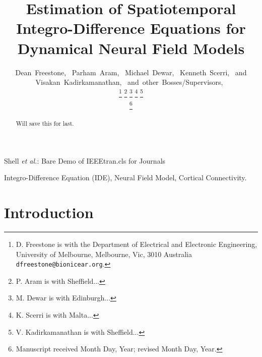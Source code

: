 \documentclass[journal]{IEEEtran}
\begin{document}
\title{Estimation of Spatiotemporal Integro-Difference Equations for Dynamical Neural Field Models}

\author{Dean~Freestone,~
        Parham~Aram,~
        Michael~Dewar,~
        Kenneth~Scerri,~
        and Visakan~Kadirkamanathan,~
        and~other~Bosses/Supervisors,~%

\thanks{D. Freestone is with the Department
of Electrical and Electronic Engineering, University of Melbourne, Melbourne,
Vic, 3010 Australia {\tt\small dfreestone@bionicear.org}.}%
\thanks{P. Aram is with Sheffield...}
\thanks{M. Dewar is with Edinburgh...}
\thanks{K. Scerri is with Malta...}
\thanks{V. Kadirkamanathan is with Sheffield...}

\thanks{Manuscript received Month Day, Year; revised Month Day, Year.}}


%
{Shell \MakeLowercase{\textit{et al.}}: Bare Demo of IEEEtran.cls for Journals}

\maketitle

\begin{abstract}
Will save this for last.
\end{abstract}


\begin{IEEEkeywords}
Integro-Difference Equation (IDE), Neural Field Model, Cortical Connectivity.
\end{IEEEkeywords}

\IEEEpeerreviewmaketitle

\section{Introduction}
\end{document}
